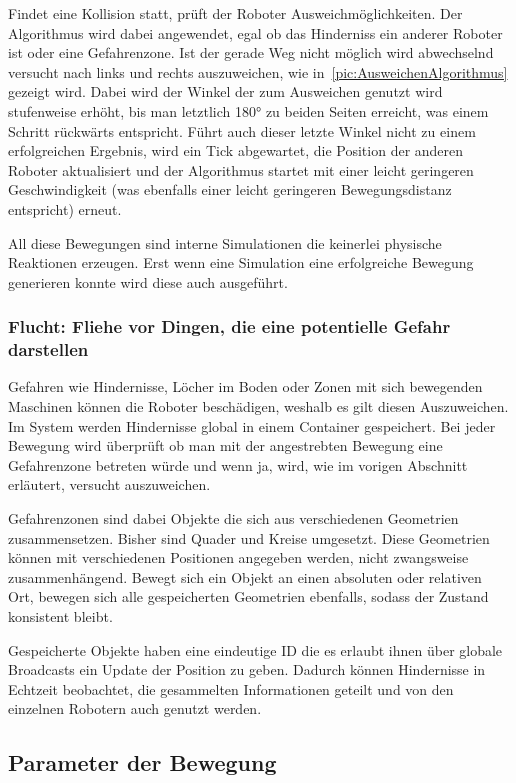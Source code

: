 Findet eine Kollision statt, prüft der Roboter Ausweichmöglichkeiten. Der Algorithmus wird dabei angewendet, egal ob das Hinderniss ein anderer Roboter ist oder eine Gefahrenzone. Ist der gerade Weg nicht möglich wird abwechselnd versucht nach links und rechts auszuweichen, wie in~\autoref{pic:AusweichenAlgorithmus} gezeigt wird. Dabei wird der Winkel der zum Ausweichen genutzt wird stufenweise erhöht, bis man letztlich 180° zu beiden Seiten erreicht, was einem Schritt rückwärts entspricht. Führt auch dieser letzte Winkel nicht zu einem erfolgreichen Ergebnis, wird ein Tick abgewartet, die Position der anderen Roboter aktualisiert und der Algorithmus startet mit einer leicht geringeren Geschwindigkeit (was ebenfalls einer leicht geringeren Bewegungsdistanz entspricht) erneut.

All diese Bewegungen sind interne Simulationen die keinerlei physische Reaktionen erzeugen. Erst wenn eine Simulation eine erfolgreiche Bewegung generieren konnte wird diese auch ausgeführt.

\subsubsection*{Flucht: Fliehe vor Dingen, die eine potentielle Gefahr darstellen}

Gefahren wie Hindernisse, Löcher im Boden oder Zonen mit sich bewegenden Maschinen können die Roboter beschädigen, weshalb es gilt diesen Auszuweichen. Im System werden Hindernisse global in einem Container gespeichert. Bei jeder Bewegung wird überprüft ob man mit der angestrebten Bewegung eine Gefahrenzone betreten würde und wenn ja, wird, wie im vorigen Abschnitt erläutert, versucht auszuweichen.

Gefahrenzonen sind dabei Objekte die sich aus verschiedenen Geometrien zusammensetzen. Bisher sind Quader und Kreise umgesetzt. Diese Geometrien können mit verschiedenen Positionen angegeben werden, nicht zwangsweise zusammenhängend. Bewegt sich ein Objekt an einen absoluten oder relativen Ort, bewegen sich alle gespeicherten Geometrien ebenfalls, sodass der Zustand konsistent bleibt.

Gespeicherte Objekte haben eine eindeutige ID die es erlaubt ihnen über globale Broadcasts ein Update der Position zu geben. Dadurch können Hindernisse in Echtzeit beobachtet, die gesammelten Informationen geteilt und von den einzelnen Robotern auch genutzt werden.

\subsection*{Parameter der Bewegung}

